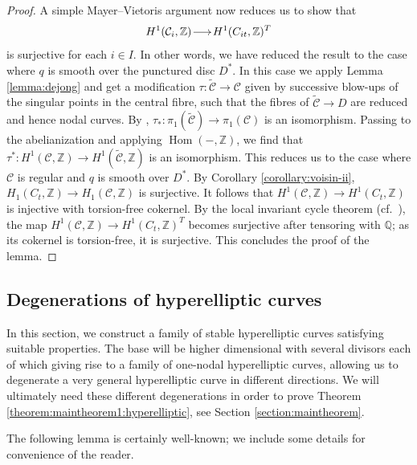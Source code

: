 \documentclass[a4paper,11pt,reqno]{amsart}
\makeatletter
\numberwithin{equation}{section}
\theoremstyle{plain}
\theoremstyle{definition}
\newcommand{\Z}{\mathbb Z}
\newcommand{\Q}{\mathbb Q}
\newcommand{\Hom}{\operatorname{Hom}}
\newcommand{\ca}[1]{{\mathcal{#1}}}
\newcommand{\wt}[1]{{\widetilde{#1}}}
\renewcommand{\longrightarrow}{\xymatrix@1@=15pt{\ar[r]&}}
\makeatother
\begin{document}
\begin{proof}
A simple Mayer--Vietoris argument now reduces us to show that
\[
H^1(\ca C_i,\Z) \longrightarrow H^1(C_{it},\Z)^T
\]
is surjective for each $i\in I$.
In other words, we have reduced the result to the case where $q$ is smooth over the punctured disc $D^*$.
In this case we apply Lemma \ref{lemma:dejong} and get a modification $\tau:\widetilde {\mathcal C}\to \mathcal C$ given by successive blow-ups of the singular points in the central fibre, such that the fibres of $\widetilde {\mathcal C}\to D$ are reduced and hence nodal curves.
By \cite[Theorem 7.8]{kollar-plurigenera}, $
\tau_\ast \colon \pi_1(\wt{\ca C}) \to \pi_1(\ca C)
$
is an isomorphism.
Passing to the abelianization and applying $\Hom(-,\Z)$, we find that  $\tau^\ast\colon H^1(\mathcal C,\Z)\to H^1(\widetilde{\mathcal C},\Z) $ is an isomorphism.
This reduces us to the case where $\mathcal C$ is regular and $q$ is smooth over $D^*$. 
By Corollary \ref{corollary:voisin-ii},  $H_1(C_t,\Z) \to H_1(\ca C,\Z)$ is surjective.
It follows that $H^1(\ca C,\Z) \to H^1(C_t,\Z)$ is injective with torsion-free cokernel.
By the local invariant cycle theorem (cf.\ \cite{morrison-clemensschmid}), the map $H^1(\ca C,\Z) \to H^1(C_t,\Z)^T$ becomes surjective after tensoring with $\Q$; as its cokernel is torsion-free, it is surjective.
This concludes the proof of the lemma.
\end{proof}

\subsection{Degenerations of hyperelliptic curves} In this section, we construct a family of stable hyperelliptic curves satisfying suitable properties. The base will be higher dimensional with several divisors each of which giving rise to a family of one-nodal hyperelliptic curves, allowing us to degenerate a very general hyperelliptic curve in different directions.
We will ultimately need these different degenerations in order to prove Theorem \ref{theorem:maintheorem1:hyperelliptic}, see Section \ref{section:maintheorem}. 

The following lemma is certainly well-known; we include some details for convenience of the reader. 
\end{document}
